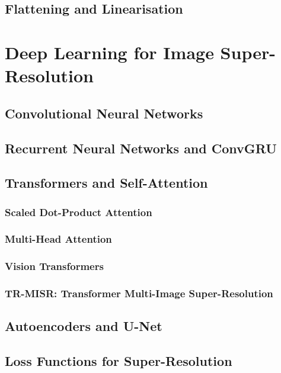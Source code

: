 \section{Flattening and Linearisation}

\chapter{Deep Learning for Image Super-Resolution}
\label{sec:dl_bg}

\section{Convolutional Neural Networks}
\section{Recurrent Neural Networks and ConvGRU}
\section{Transformers and Self-Attention}
\subsection{Scaled Dot-Product Attention}
\subsection{Multi-Head Attention}
\subsection{Vision Transformers}
\subsection{TR-MISR: Transformer Multi-Image Super-Resolution}
\section{Autoencoders and U-Net}
\section{Loss Functions for Super-Resolution}
